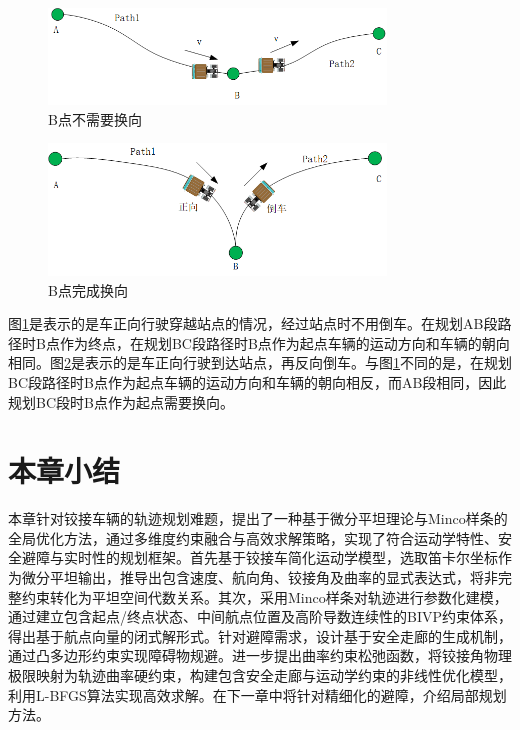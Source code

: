 \documentclass[master,academic]{ysuthesis} %
\begin{document}
		\newpage
		\vspace*{-1.0em}

		\begin{figure}[H]
			\centering
			\includegraphics[width=0.8\textwidth]{换向1.png}
			\caption{B点不需要换向}
			\label{fig:换向1}
		\end{figure}
		\begin{figure}[H]
			\centering
			\includegraphics[width=0.8\textwidth]{换向2.png}
			\caption{B点完成换向}
			\label{fig:换向2}
		\end{figure}

		图\ref{fig:换向1}是表示的是车正向行驶穿越站点的情况，经过站点时不用倒车。在规划AB段路径时B点作为终点，在规划BC段路径时B点作为起点车辆的运动方向和车辆的朝向相同。图\ref{fig:换向2}是表示的是车正向行驶到达站点，再反向倒车。与图\ref{fig:换向1}不同的是，在规划BC段路径时B点作为起点车辆的运动方向和车辆的朝向相反，而AB段相同，因此规划BC段时B点作为起点需要换向。

	\section{本章小结}
	本章针对铰接车辆的轨迹规划难题，提出了一种基于微分平坦理论与Minco样条的全局优化方法，通过多维度约束融合与高效求解策略，实现了符合运动学特性、安全避障与实时性的规划框架。首先基于铰接车简化运动学模型，选取笛卡尔坐标作为微分平坦输出，推导出包含速度、航向角、铰接角及曲率的显式表达式，将非完整约束转化为平坦空间代数关系。其次，采用Minco样条对轨迹进行参数化建模，通过建立包含起点/终点状态、中间航点位置及高阶导数连续性的BIVP约束体系，得出基于航点向量的闭式解形式。针对避障需求，设计基于安全走廊的生成机制，通过凸多边形约束实现障碍物规避。进一步提出曲率约束松弛函数，将铰接角物理极限映射为轨迹曲率硬约束，构建包含安全走廊与运动学约束的非线性优化模型，利用L-BFGS算法实现高效求解。在下一章中将针对精细化的避障，介绍局部规划方法。
	
\end{document}
